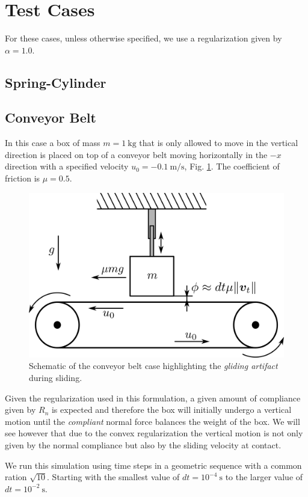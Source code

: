 
\section{Test Cases}
\label{sec:test_cases}

For these cases, unless otherwise specified, we use a regularization given by
$\alpha=1.0$. 

\subsection{Spring-Cylinder}
\label{sec:spring_cylinder}


\subsection{Conveyor Belt}
\label{sec:conveyor_belt}

In this case a box of mass $m=1~\text{kg}$ that is only allowed to move in the
vertical direction is placed on top of a conveyor belt moving horizontally in
the $-x$ direction with a specified velocity $u_0=-0.1~\text{m}/\text{s}$, Fig.
\ref{fig:conveyor_belt}. The coefficient of friction is $\mu=0.5$.

\begin{figure}[!h]
	\centering
	\includegraphics[width=0.4\columnwidth]{figures/conveyor_belt/conveyor_belt.png}
	\caption{\label{fig:conveyor_belt} 
	Schematic of the conveyor belt case highlighting the \textit{gliding
	artifact} during sliding.}
\end{figure}

Given the regularization used in this formulation, a given amount of compliance
given by $R_n$ is expected and therefore the box will initially undergo a
vertical motion until the \textit{compliant} normal force balances the weight of
the box. We will see however that due to the convex regularization the vertical
motion is not only given by the normal compliance but also by the sliding
velocity at contact.

We run this simulation using time steps in a geometric sequence with a common
ration $\sqrt{10}$. Starting with the smallest value of $dt = 10^{-4}~\text{s}$
to the larger value of $dt = 10^{-2}~\text{s}$.

